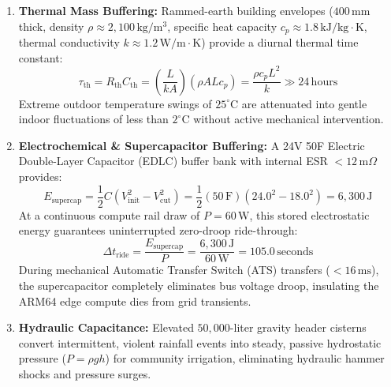 \begin{enumerate}
    \item \textbf{Thermal Mass Buffering:} Rammed-earth building envelopes ($400\,\mathrm{mm}$ thick, density $\rho \approx 2,100\,\mathrm{kg/m^3}$, specific heat capacity $c_p \approx 1.8\,\mathrm{kJ/kg\cdot K}$, thermal conductivity $k \approx 1.2\,\mathrm{W/m\cdot K}$) provide a diurnal thermal time constant:
    \begin{equation}
    \tau_{\mathrm{th}} = R_{\mathrm{th}} C_{\mathrm{th}} = \left(\frac{L}{k A}\right) (\rho A L c_p) = \frac{\rho c_p L^2}{k} \gg 24\,\mathrm{hours}
    \label{eq:thermal_time_constant}
    \end{equation}
    Extreme outdoor temperature swings of $25^\circ\mathrm{C}$ are attenuated into gentle indoor fluctuations of less than $2^\circ\mathrm{C}$ without active mechanical intervention.
    
    \item \textbf{Electrochemical \& Supercapacitor Buffering:} A 24V 50F Electric Double-Layer Capacitor (EDLC) buffer bank with internal ESR $<12\,\mathrm{m}\Omega$ provides:
    \begin{equation}
    E_{\mathrm{supercap}} = \frac{1}{2} C \left(V_{\mathrm{init}}^2 - V_{\mathrm{cut}}^2\right) = \frac{1}{2} (50\,\mathrm{F}) \left(24.0^2 - 18.0^2\right) = 6,300\,\mathrm{J}
    \label{eq:supercap_ride_through_energy}
    \end{equation}
    At a continuous compute rail draw of $P = 60\,\mathrm{W}$, this stored electrostatic energy guarantees uninterrupted zero-droop ride-through:
    \begin{equation}
    \Delta t_{\mathrm{ride}} = \frac{E_{\mathrm{supercap}}}{P} = \frac{6,300\,\mathrm{J}}{60\,\mathrm{W}} = 105.0\,\mathrm{seconds}
    \label{eq:supercap_ride_through_time}
    \end{equation}
    During mechanical Automatic Transfer Switch (ATS) transfers ($<16\,\mathrm{ms}$), the supercapacitor completely eliminates bus voltage droop, insulating the ARM64 edge compute dies from grid transients.
    
    \item \textbf{Hydraulic Capacitance:} Elevated $50,000$-liter gravity header cisterns convert intermittent, violent rainfall events into steady, passive hydrostatic pressure ($P = \rho g h$) for community irrigation, eliminating hydraulic hammer shocks and pressure surges.
\end{enumerate}

